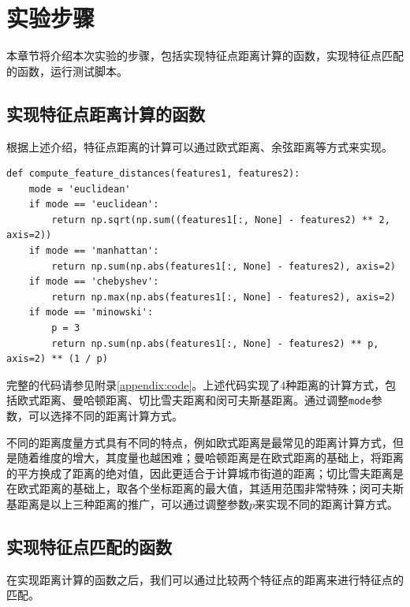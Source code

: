 \section{实验步骤}

本章节将介绍本次实验的步骤，包括实现特征点距离计算的函数，实现特征点匹配的函数，运行测试脚本。

\subsection{实现特征点距离计算的函数}

根据上述介绍，特征点距离的计算可以通过欧式距离、余弦距离等方式来实现。

\begin{lstlisting}[style=Python]
def compute_feature_distances(features1, features2):
    mode = 'euclidean'
    if mode == 'euclidean':
        return np.sqrt(np.sum((features1[:, None] - features2) ** 2, axis=2))
    if mode == 'manhattan':
        return np.sum(np.abs(features1[:, None] - features2), axis=2)
    if mode == 'chebyshev':
        return np.max(np.abs(features1[:, None] - features2), axis=2)
    if mode == 'minowski':
        p = 3
        return np.sum(np.abs(features1[:, None] - features2) ** p, axis=2) ** (1 / p)
\end{lstlisting}

完整的代码请参见附录\ref{appendix:code}。上述代码实现了4种距离的计算方式，包括欧式距离、曼哈顿距离、切比雪夫距离和闵可夫斯基距离。通过调整\texttt{mode}参数，可以选择不同的距离计算方式。

不同的距离度量方式具有不同的特点，例如欧式距离是最常见的距离计算方式，但是随着维度的增大，其度量也越困难；曼哈顿距离是在欧式距离的基础上，将距离的平方换成了距离的绝对值，因此更适合于计算城市街道的距离；切比雪夫距离是在欧式距离的基础上，取各个坐标距离的最大值，其适用范围非常特殊；闵可夫斯基距离是以上三种距离的推广，可以通过调整参数$p$来实现不同的距离计算方式。

\subsection{实现特征点匹配的函数}

在实现距离计算的函数之后，我们可以通过比较两个特征点的距离来进行特征点的匹配。

